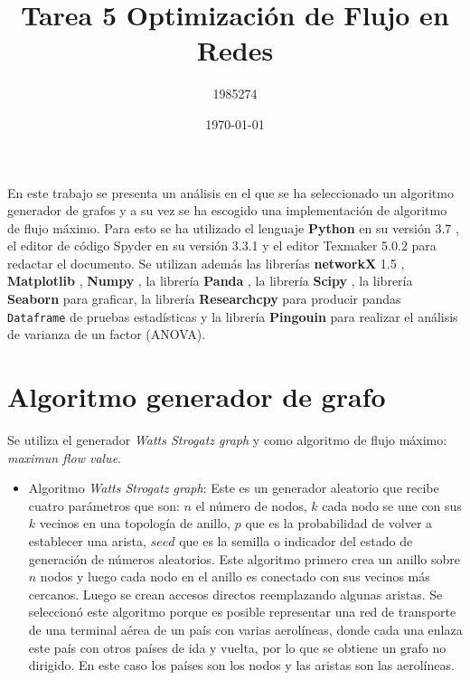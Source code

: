 \documentclass{article}
\begin{document}
\title{Tarea 5 Optimización de Flujo en Redes}
\author{1985274}
\date{\today}
\maketitle 

\maketitle

En este trabajo se presenta un análisis en el que se ha seleccionado un algoritmo generador de grafos y a su vez se ha escogido una implementación de algoritmo de flujo máximo. Para esto se ha utilizado el lenguaje \textbf{Python} en su versión 3.7 \cite{python}, el editor de código Spyder en su versión 3.3.1 y el editor Texmaker 5.0.2 para redactar el documento. Se utilizan además las librerías \textbf{networkX} 1.5 \cite{networkx}, \textbf{Matplotlib} \cite{matplotlib}, \textbf{Numpy}  \cite{numpy}, la librería \textbf{Panda} \cite{panda}, la librería \textbf{Scipy} \cite{scipy}, la librería \textbf{Seaborn} \cite{seaborn} para graficar, la librería \textbf{Researchcpy} \cite{researchcpy} para producir pandas \texttt{Dataframe} de pruebas estadísticas y la librería \textbf{Pingouin} \cite{pingouin} para realizar el análisis de varianza de un factor (ANOVA). 

\section{Algoritmo generador de grafo}  
Se utiliza el generador \textit{Watts Strogatz graph} y como algoritmo de flujo máximo: \textit{maximun flow value}.

\begin{itemize}
 
  \item Algoritmo \textit{Watts Strogatz graph}: Este es un generador aleatorio que recibe cuatro parámetros que son: $n$ el número de nodos, $k$ cada nodo se une con sus $k$ vecinos en una topología de anillo, $p$ que es la probabilidad de volver a establecer una arista, $seed$ que es la semilla o indicador del estado de generación de números aleatorios. Este algoritmo primero crea un anillo sobre $n$ nodos y luego cada nodo en el anillo es conectado con sus vecinos más cercanos. Luego se crean accesos directos reemplazando algunas aristas. Se seleccionó este algoritmo porque es posible representar una red de transporte de una terminal aérea de un país con varias aerolíneas, donde cada una enlaza este país con otros países de ida y vuelta, por lo que se obtiene un grafo no dirigido. En este caso los países son los nodos y las aristas son las aerolíneas.  

\end{itemize}
\end{document}
